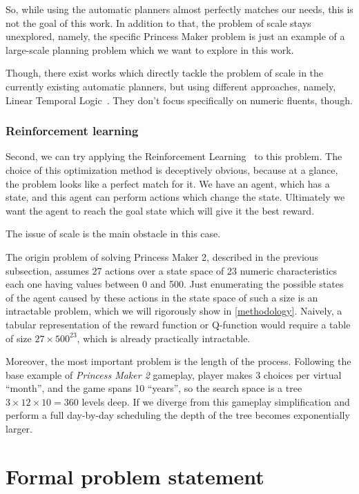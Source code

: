\documentclass[12pt, a4paper]{report}
\begin{document}
	So, while using the automatic planners almost perfectly matches our needs, this is not the goal of this work.
	In addition to that, the problem of scale stays unexplored, namely, the specific Princess Maker problem is just an example of a large-scale planning problem which we want to explore in this work.
	
	Though, there exist works which directly tackle the problem of scale in the currently existing automatic planners, but using different approaches, namely, Linear Temporal Logic~\cite{LU2025121666}.
	They don't focus specifically on numeric fluents, though.

  \subsection{Reinforcement learning}
	Second, we can try applying the Reinforcement Learning~\cite{sutton2018reinforcement} to this problem.
	The choice of this optimization method is deceptively obvious, because at a glance, the problem looks like a perfect match for it.
	We have an agent, which has a state, and this agent can perform actions which change the state.
	Ultimately we want the agent to reach the goal state which will give it the best reward.
	
	The issue of scale is the main obstacle in this case.

	The origin problem of solving Princess Maker 2, described in the previous subsection,  assumes 27 actions over a state space of 23 numeric characteristics each one having values between 0 and 500.
	Just enumerating the possible states of the agent caused by these actions in the state space of such a size is an intractable problem, which we will rigorously show in \ref{methodology}.
	Naively, a tabular representation of the reward function or Q-function would require a table of size $27 \times 500^{23}$, which is already practically intractable.
	
	Moreover, the most important problem is the length of the process.
	Following the base example of \textit{Princess Maker 2} gameplay, player makes 3 choices per virtual ``month'', and the game spans 10 ``years'', so the search space is a tree $3 \times 12 \times 10 = 360$ levels deep.
	If we diverge from this gameplay simplification and perform a full day-by-day scheduling the depth of the tree becomes exponentially larger.
	
	\chapter{Formal problem statement}\label{problem-statement}
\end{document}
